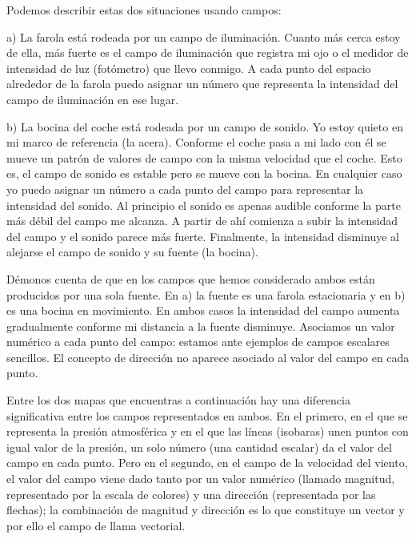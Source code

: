 Podemos describir estas dos situaciones usando campos:

a) La farola está rodeada por un campo de iluminación. Cuanto más cerca estoy de ella, más fuerte es el campo de iluminación que registra mi ojo o el medidor de intensidad de luz (fotómetro) que llevo conmigo. A cada punto del espacio alrededor de la farola puedo asignar un número que representa la intensidad del campo de iluminación en ese lugar.

b) La bocina del coche está rodeada por un campo de sonido. Yo estoy quieto en mi marco de referencia (la acera). Conforme el coche pasa a mi lado con él se mueve un patrón de valores de campo con la misma velocidad que el coche. Esto es, el campo de sonido es estable pero se mueve con la bocina. En cualquier caso yo puedo asignar un número a cada punto del campo para representar la intensidad del sonido. Al principio el sonido es apenas audible conforme la parte más débil del campo me alcanza. A partir de ahí comienza a subir la intensidad del campo y el sonido parece más fuerte. Finalmente, la intensidad disminuye al alejarse el campo de sonido y su fuente (la bocina).


Démonos cuenta de que en los campos que hemos considerado ambos están producidos por una sola fuente. En a) la fuente es una farola estacionaria y en b) es una bocina en movimiento. En ambos casos la intensidad del campo aumenta gradualmente conforme mi distancia a la fuente disminuye. Asociamos un valor numérico a cada punto del campo: estamos ante ejemplos de campos escalares sencillos. El concepto de dirección no aparece asociado al valor del campo en cada punto.

Entre los dos mapas que encuentras a continuación hay una diferencia significativa entre los campos representados en ambos. En el primero, en el que se representa la presión atmosférica y en el que las líneas (isobaras) unen puntos con igual valor de la presión, un solo número (una cantidad escalar) da el valor del campo en cada punto. Pero en el segundo, en el campo de la velocidad del viento, el valor del campo viene dado tanto por un valor numérico (llamado magnitud, representado por la escala de colores) y una dirección (representada por las flechas); la combinación de magnitud y dirección es lo que constituye un vector y por ello el campo de llama vectorial.
	
